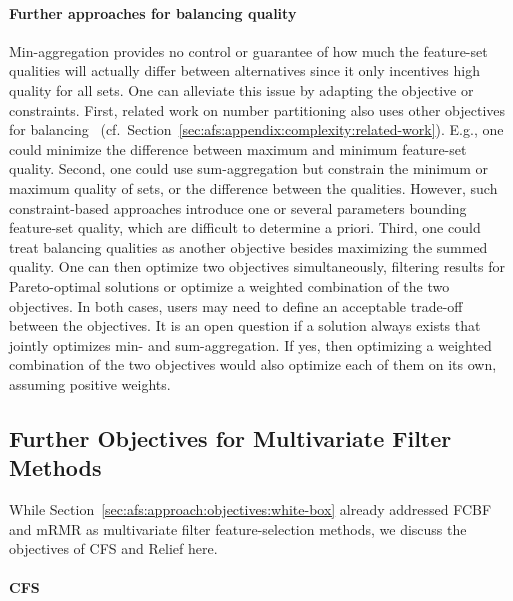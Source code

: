 \documentclass{article}
\theoremstyle{definition}
\begin{document}
\paragraph{Further approaches for balancing quality}

Min-aggregation provides no control or guarantee of how much the feature-set qualities will actually differ between alternatives since it only incentives high quality for all sets.
One can alleviate this issue by adapting the objective or constraints.
First, related work on number partitioning also uses other objectives for balancing~\cite{korf2010objective, lawrinenko2017identical} (cf.~Section~\ref{sec:afs:appendix:complexity:related-work}).
E.g., one could minimize the difference between maximum and minimum feature-set quality.
Second, one could use sum-aggregation but constrain the minimum or maximum quality of sets, or the difference between the qualities.
However, such constraint-based approaches introduce one or several parameters bounding feature-set quality, which are difficult to determine a priori.
Third, one could treat balancing qualities as another objective besides maximizing the summed quality.
One can then optimize two objectives simultaneously, filtering results for Pareto-optimal solutions or optimize a weighted combination of the two objectives.
In both cases, users may need to define an acceptable trade-off between the objectives.
It is an open question if a solution always exists that jointly optimizes min- and sum-aggregation.
If yes, then optimizing a weighted combination of the two objectives would also optimize each of them on its own, assuming positive weights.

\subsection{Further Objectives for Multivariate Filter Methods}
\label{sec:afs:appendix:multivariate-filter-objectives}

While Section~\ref{sec:afs:approach:objectives:white-box} already addressed FCBF and mRMR as multivariate filter feature-selection methods, we discuss the objectives of CFS and Relief here.

\paragraph{CFS}
\end{document}

